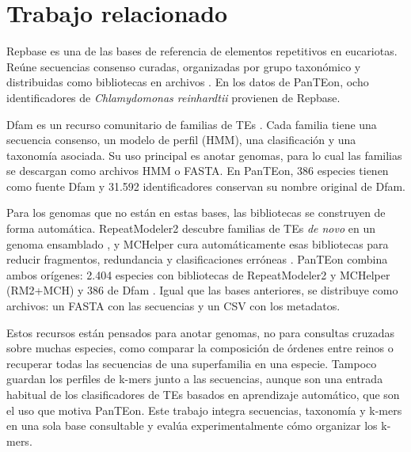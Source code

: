 \documentclass[unnumsec,namedate,webpdf,contemporary,large]{oup-authoring-template}
\begin{document}
\section{Trabajo relacionado}

Repbase es una de las bases de referencia de elementos repetitivos en eucariotas. Re\'une secuencias consenso curadas, organizadas por grupo taxon\'omico y distribuidas como bibliotecas en archivos \citep{bao2015repbase}. En los datos de PanTEon, ocho identificadores de \textit{Chlamydomonas reinhardtii} provienen de Repbase.

Dfam es un recurso comunitario de familias de TEs \citep{storer2021dfam}. Cada familia tiene una secuencia consenso, un modelo de perfil (HMM), una clasificaci\'on y una taxonom\'ia asociada. Su uso principal es anotar genomas, para lo cual las familias se descargan como archivos HMM o FASTA. En PanTEon, 386 especies tienen como fuente Dfam y 31.592 identificadores conservan su nombre original de Dfam.

Para los genomas que no est\'an en estas bases, las bibliotecas se construyen de forma autom\'atica. RepeatModeler2 descubre familias de TEs \textit{de novo} en un genoma ensamblado \citep{flynn2020repeatmodeler2}, y MCHelper cura autom\'aticamente esas bibliotecas para reducir fragmentos, redundancia y clasificaciones err\'oneas \citep{orozcoarias2024mchelper}. PanTEon combina ambos or\'igenes: 2.404 especies con bibliotecas de RepeatModeler2 y MCHelper (RM2+MCH) y 386 de Dfam \citep{orozcoarias2026panteon}. Igual que las bases anteriores, se distribuye como archivos: un FASTA con las secuencias y un CSV con los metadatos.

Estos recursos est\'an pensados para anotar genomas, no para consultas cruzadas sobre muchas especies, como comparar la composici\'on de \'ordenes entre reinos o recuperar todas las secuencias de una superfamilia en una especie. Tampoco guardan los perfiles de k-mers junto a las secuencias, aunque son una entrada habitual de los clasificadores de TEs basados en aprendizaje autom\'atico, que son el uso que motiva PanTEon. Este trabajo integra secuencias, taxonom\'ia y k-mers en una sola base consultable y eval\'ua experimentalmente c\'omo organizar los k-mers.
\end{document}
